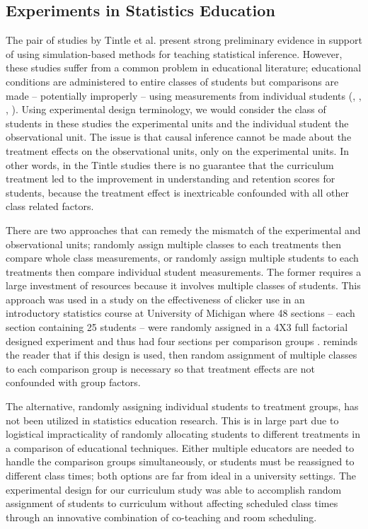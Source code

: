 \documentclass[11pt]{isuthesis}
\begin{document}
\subsection{Experiments in Statistics Education} 

The pair of studies by Tintle et al. present strong preliminary evidence in support of using simulation-based methods for teaching statistical inference. However, these studies suffer from a common problem in educational literature; educational conditions are administered to entire classes of students but comparisons are made -- potentially improperly -- using measurements from individual students (\citealt{Ragasa2008}, \citealt{BaglinDaCosta2013}, \citealt{Williams2012}, \citealt{Carlson2011}). Using experimental design terminology, we would consider the class of students in these studies the experimental units and the individual student the observational unit. The issue is that causal inference cannot be made about the treatment effects on the observational units, only on the experimental units.  In other words, in the Tintle studies there is no guarantee that the curriculum treatment led to the improvement in understanding and retention scores for students, because the treatment effect is inextricable confounded with all other class related factors.

There are two approaches that can remedy the mismatch of the experimental and observational units; randomly assign multiple classes to each treatments then compare whole class measurements, or randomly assign multiple students to each treatments then compare individual student measurements. The former requires a large investment of resources because it involves multiple classes of students. This approach was used in a study on the effectiveness of clicker use in an introductory statistics course at University of Michigan where 48 sections -- each section containing 25 students -- were randomly assigned in a 4X3 full factorial designed experiment and thus had four sections per comparison groups \citep{McGowanGunderson2010}. \citet{McGowan2011} reminds the reader that if this design is used, then random assignment of multiple classes to each comparison group is necessary so that treatment effects are not confounded with group factors. 

The alternative, randomly assigning individual students to treatment groups, has not been utilized in statistics education research. This is in large part due to logistical impracticality of randomly allocating students to different treatments in a comparison of educational techniques. Either multiple educators are needed to handle the comparison groups simultaneously, or students must be reassigned to different class times; both options are far from ideal in a university settings. The experimental design for our curriculum study was able to accomplish random assignment of students to curriculum without affecting scheduled class times through an innovative combination of co-teaching and room scheduling.
\end{document}
